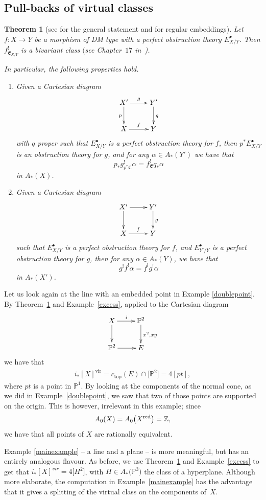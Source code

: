 \documentclass[pdftex]{sigma}
\numberwithin{equation}{section}
\newtheorem{Theorem}{Theorem}[section]
\newcommand{\PP}{\mathbb P}
\theoremstyle{plain}
\theoremstyle{definition}
\theoremstyle{remark}
\begin{document}
\subsection{Pull-backs of virtual classes}
\begin{Theorem}[see \cite{vir-pull} for the general statement and {\cite[Chapter 6]{Fulton}} for regular embeddings]\label{vir pull-back} Let $f\colon X\to Y$ be a morphism of DM type with a perfect obstruction theory $E^\bullet_{X/Y}$. Then $f^!_{\mathfrak E_{X/Y}}$ is a bivariant class $($see Chapter~$17$ in~{\rm \cite{Fulton})}.

In particular, the following properties hold.
\begin{enumerate}\itemsep=0pt
\item[$(a)$] Given a Cartesian diagram
\[
\xymatrix{X'\ar[r]^g\ar[d]_p&Y'\ar[d]^q\\
X\ar[r]^f&Y}\]
with $q$ proper such that $E^\bullet_{X/Y}$ is a perfect obstruction theory for $f$, then $p^*E^\bullet_{X/Y}$ is an obstruction theory for $g$, and for any $\alpha\in A_*(Y')$ we have that
\[p_*g^!_{p^*\mathfrak E}\alpha=f^!_{\mathfrak E}q_*\alpha
\]
in $A_*(X)$.

\item[$(b)$] Given a Cartesian diagram
\[
\xymatrix{X'\ar[r]\ar[d]&Y'\ar[d]^g\\
X\ar[r]^f&Y}\]
such that $E^\bullet_{X/Y}$ is a perfect obstruction theory for $f$, and $E^\bullet_{Y'/Y}$ is a perfect obstruction theory for $g$, then for any $\alpha\in A_*(Y)$, we have that
\[g^!f^!\alpha=f^!g^!\alpha
\]
in $A_*(X')$.
\end{enumerate}
\end{Theorem}
\begin{Remark}Let us look again at the line with an embedded point in Example \ref{doublepoint}.
By Theo\-rem~\ref{vir pull-back} and Example~\ref{excess}, applied to the Cartesian diagram
\[\xymatrix{X\ar[r]^i\ar[d]&\PP^2\ar[d]^{x^2,xy}\\
\PP^2\ar[r]& E
}
\]
we have that
\begin{gather*}i_*[X]^\text{vir}= c_\text{top} (E)\cap \big[\mathbb P^2\big] =4[pt],
\end{gather*}
where $pt$ is a point in $\PP^1$. By looking at the components of the normal cone, as we did in Example~\ref{doublepoint}, we saw that two of those points are supported on the origin. This is however, irrelevant in this example; since
\[A_0(X)=A_0\big(X^{{\rm red}}\big)=\mathbb Z,
\]
we have that all points of $X$ are rationally equivalent.

Example \ref{mainexample} -- a line and a plane -- is more meaningful, but has an entirely analogous flavour. As before, we use Theorem~\ref{vir pull-back} and Example~\ref{excess} to get that $i_*[X]^{vir}=4\big[H^2\big]$, with $H\in A_*\big(\PP^3\big)$ the class of a hyperplane. Although more elaborate, the computation in Example~\ref{mainexample} has the advantage that it gives a splitting of the virtual class on the components of~$X$.
\end{Remark}
\end{document}
